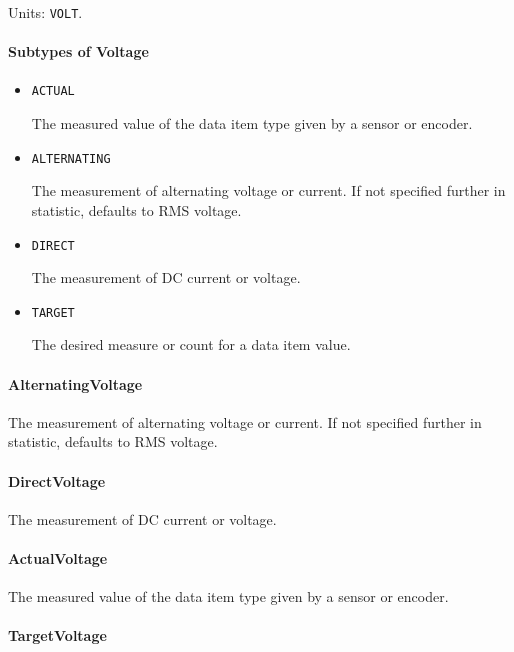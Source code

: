 Units: \texttt{VOLT}.

\paragraph{Subtypes of Voltage}\mbox{}
\label{sec:Subtypes of Voltage}

\begin{itemize}

\item \texttt{ACTUAL}


The measured value of the data item type given by a sensor or encoder.

\item \texttt{ALTERNATING}


The measurement of alternating voltage or current.   If not specified further in statistic, defaults to RMS voltage. 

\item \texttt{DIRECT}


The measurement of DC current or voltage.

\item \texttt{TARGET}


The desired measure or count for a data item value.


\end{itemize}

\paragraph{AlternatingVoltage}\mbox{}
\label{sec:AlternatingVoltage}


The measurement of alternating voltage or current.   If not specified further in statistic, defaults to RMS voltage. 


\paragraph{DirectVoltage}\mbox{}
\label{sec:DirectVoltage}


The measurement of DC current or voltage.


\paragraph{ActualVoltage}\mbox{}
\label{sec:ActualVoltage}


The measured value of the data item type given by a sensor or encoder.


\paragraph{TargetVoltage}\mbox{}
\label{sec:TargetVoltage}


